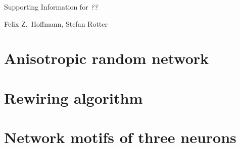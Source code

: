 \documentclass[11pt, paper=a4]{article}
\begin{document}
\begin{center}
  \Large
  Supporting Information for \textit{??}
  \smallskip
  \normalsize
  
  Felix Z.~Hoffmann, Stefan Rotter
\end{center}

\section{Anisotropic random network}



\clearpage
\newpage

\section{Rewiring algorithm}


\clearpage
\newpage

\section{Network motifs of three neurons}

\end{document}

